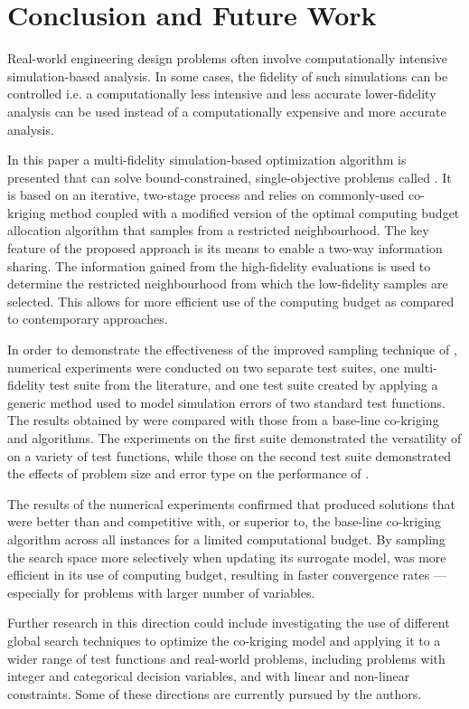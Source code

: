 \section{Conclusion and Future Work}\label{sec:conc}
Real-world engineering design problems often involve computationally intensive simulation-based analysis. In some cases, the fidelity of such simulations can be controlled i.e. a computationally less intensive and less accurate lower-fidelity analysis can be used instead of a computationally expensive and more accurate analysis.

In this paper a multi-fidelity simulation-based optimization algorithm is presented that can solve bound-constrained, single-objective problems called \AlgName{}. It is based on an iterative, two-stage process and relies on commonly-used co-kriging method coupled with a modified version of the optimal computing budget allocation algorithm that samples from a restricted neighbourhood. The key feature of the proposed approach is its means to enable a two-way information sharing. The information gained from the high-fidelity evaluations is used to determine the restricted neighbourhood from which the low-fidelity samples are selected. This allows for more efficient use of the computing budget as compared to contemporary approaches.

In order to demonstrate the effectiveness of the improved sampling technique of \AlgName{}, numerical experiments were conducted on two separate test suites, one multi-fidelity test suite from the literature, and one test suite created by applying a generic method used to model simulation errors of two standard test functions. The results  obtained by \AlgName{} were compared with those from a base-line co-kriging and \motos{} algorithms.  The experiments on the first suite demonstrated the versatility of \AlgName{} on a variety of test functions, while those on the second test suite demonstrated the effects of problem size and error type on the performance of \AlgName{}.

The results of the numerical experiments confirmed that \AlgName{} produced solutions that were better than \motos{} and competitive with, or superior to, the base-line co-kriging algorithm across all instances for a limited computational budget. By sampling the search space more selectively when updating its surrogate model, \AlgName{} was more efficient in its use of computing budget, resulting in faster convergence rates --- especially for problems with larger number of variables.

Further research in this direction could include investigating the use of different global search techniques to optimize the co-kriging model and applying it to a wider range of test functions and real-world problems, including problems with integer and categorical decision variables, and with linear and non-linear constraints. Some of these directions are currently pursued by the authors.